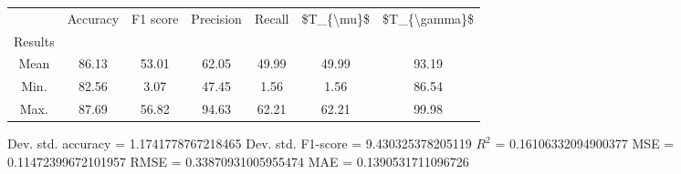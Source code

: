 \begin{tabular}{|c|c|c|c|c|c|c|}
\toprule
{} &  Accuracy &  F1 score &  Precision &  Recall &  \$T\_\{\textbackslash mu\}\$ &  \$T\_\{\textbackslash gamma\}\$ \\
Results &           &           &            &         &            &               \\
\hline
Mean    &     86.13 &     53.01 &      62.05 &   49.99 &      49.99 &         93.19 \\
Min.    &     82.56 &      3.07 &      47.45 &    1.56 &       1.56 &         86.54 \\
Max.    &     87.69 &     56.82 &      94.63 &   62.21 &      62.21 &         99.98 \\
\bottomrule
\end{tabular}

 Dev. std. accuracy = 1.1741778767218465
 Dev. std. F1-score = 9.430325378205119
 $R^2$ = 0.16106332094900377
 MSE = 0.11472399672101957
 RMSE = 0.33870931005955474
 MAE = 0.1390531711096726